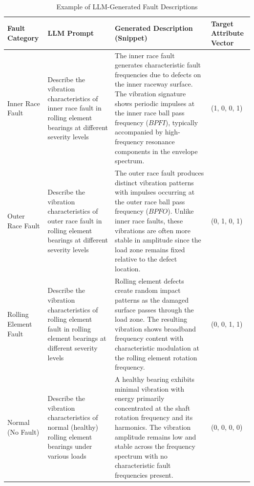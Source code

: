 \begin{table}[htbp]
\centering
\caption{Example of LLM-Generated Fault Descriptions}
\label{tab:llm_descriptions}
\begin{tabular}{p{3cm}p{4.5cm}p{5.5cm}p{3.5cm}}
\toprule
\textbf{Fault Category} & \textbf{LLM Prompt} & \textbf{Generated Description (Snippet)} & \textbf{Target Attribute Vector} \\
\midrule
Inner Race Fault & Describe the vibration characteristics of inner race fault in rolling element bearings at different severity levels & The inner race fault generates characteristic fault frequencies due to defects on the inner raceway surface. The vibration signature shows periodic impulses at the inner race ball pass frequency ($BPFI$), typically accompanied by high-frequency resonance components in the envelope spectrum. & (1, 0, 0, 1) \\
\midrule
Outer Race Fault & Describe the vibration characteristics of outer race fault in rolling element bearings at different severity levels & The outer race fault produces distinct vibration patterns with impulses occurring at the outer race ball pass frequency ($BPFO$). Unlike inner race faults, these vibrations are often more stable in amplitude since the load zone remains fixed relative to the defect location. & (0, 1, 0, 1) \\
\midrule
Rolling Element Fault & Describe the vibration characteristics of rolling element fault in rolling element bearings at different severity levels & Rolling element defects create random impact patterns as the damaged surface passes through the load zone. The resulting vibration shows broadband frequency content with characteristic modulation at the rolling element rotation frequency. & (0, 0, 1, 1) \\
\midrule
Normal (No Fault) & Describe the vibration characteristics of normal (healthy) rolling element bearings under various loads & A healthy bearing exhibits minimal vibration with energy primarily concentrated at the shaft rotation frequency and its harmonics. The vibration amplitude remains low and stable across the frequency spectrum with no characteristic fault frequencies present. & (0, 0, 0, 0) \\
\bottomrule
\end{tabular}
\end{table}